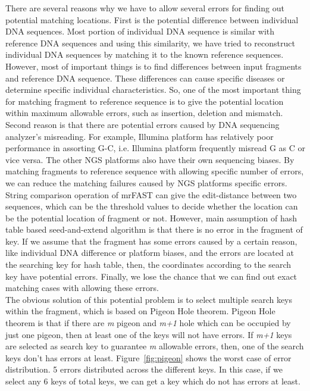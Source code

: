 There are several reasons why we have to allow several errors for finding out
potential matching locations. First is the potential difference between
individual DNA sequences. Most portion of individual DNA sequence is similar
with reference DNA sequences and using this similarity, we have tried to
reconstruct individual DNA sequences by matching it to the known reference
sequences. However, most of important things is to find differences between
input fragments and reference DNA sequence. These differences can cause specific
diseases or determine specific individual characteristics. So, one of the most
important thing for matching fragment to reference sequence is to give the
potential location within maximum allowable errors, such as insertion, deletion
and mismatch. Second reason is that there are potential errors caused by DNA
sequencing analyzer’s misreading. For example, Illumina platform has relatively
poor performance in assorting G-C, i.e. Illumina platform frequently misread G
as C or vice versa. The other NGS platforms also have their own sequencing
biases. By matching fragments to reference sequence with allowing specific
number of errors, we can reduce the matching failures caused by NGS platforms
specific errors. String comparison operation of mrFAST can give the
edit-distance between two sequences, which can be the threshold values to decide
whether the location can be the potential location of fragment or not. However,
main assumption of hash table based seed-and-extend algorithm is that there is
no error in the fragment of key. If we assume that the fragment has some errors
caused by a certain reason, like individual DNA difference or platform biases,
and the errors are located at the searching key for hash table, then, the
coordinates according to the search key have potential errors. Finally, we lose
the chance that we can find out exact matching cases with allowing these
errors.\\

The obvious solution of this potential problem is to select multiple search keys
within the fragment, which is based on Pigeon Hole theorem. Pigeon Hole theorem
is that if there are \textit{m} pigeon and \textit{m+1} hole which can be
occupied by just one pigeon, then at least one of the keys will not have errors.
If \textit{m+1} keys are selected as search key to guarantee \textit{m}
allowable errors, then, one of the search keys don’t has errors at least.
Figure~\ref{fig:pigeon} shows the worst case of error distribution. 5 errors
distributed across the different keys. In this case, if we select any 6 keys of
total keys, we can get a key which do not has errors at least. 

